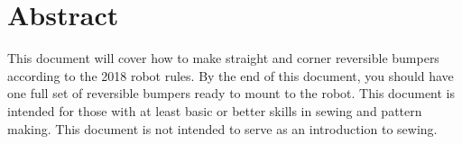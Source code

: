 \documentclass[
10pt, %
a4paper, %
oneside, %
headinclude,footinclude, %
BCOR5mm, %
]{scrartcl}
\title{\normalfont\spacedallcaps{Reversible Bumper Instructions}} %
\author{\spacedlowsmallcaps{Judy Bryant \& Joshua Bryant}} %
\date{\today} %
\begin{document}

\renewcommand{\sectionmark}[1]{\markright{\spacedlowsmallcaps{#1}}} %
\lehead{\mbox{\llap{\small\thepage\kern1em\color{halfgray} \vline}\color{halfgray}\hspace{0.5em}\rightmark\hfil}} %

\pagestyle{scrheadings} %


\maketitle %

\setcounter{tocdepth}{2} %

\tableofcontents %

\listoffigures %



\section*{Abstract} %

This document will cover how to make straight and corner reversible bumpers according to the 2018 robot rules. By the end of this document, you should have one full set of reversible bumpers ready to mount to the robot. This document is intended for those with at least basic or better skills in sewing and pattern making. This document is not intended to serve as an introduction to sewing.
\end{document}
